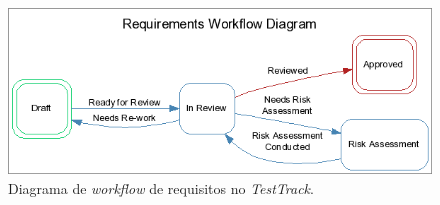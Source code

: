 \begin{itemize}
\begin{itemize}
	  \begin{figure}[!htbp]
	    \centering
	    \includegraphics[scale=0.65]{editaveis/figuras/workflow_testtrack}
	    \caption[Exemplo de um diagrama de workflow de requisitos no TestTrack]
		{Diagrama de \textit{workflow} de requisitos no \textit{TestTrack}. \footnotemark}
	    \label{workflow_testtrack}
	  \end{figure}
	  \
      
      \end{itemize}
      
  \end{itemize}
 
 